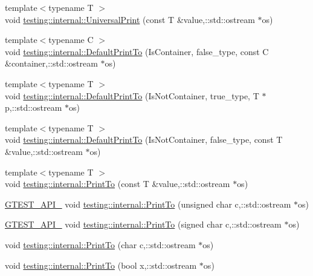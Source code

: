 \begin{DoxyCompactItemize}
\item 
{\footnotesize template$<$typename T $>$ }\\void \hyperlink{namespacetesting_1_1internal_ad121a890bddf866e59605d1a0198dada}{testing\+::internal\+::\+Universal\+Print} (const T \&value,\+::std\+::ostream $\ast$os)
\item 
{\footnotesize template$<$typename C $>$ }\\void \hyperlink{namespacetesting_1_1internal_a729016f07085b1cfb44d21331f791141}{testing\+::internal\+::\+Default\+Print\+To} (Is\+Container, false\+\_\+type, const C \&container,\+::std\+::ostream $\ast$os)
\item 
{\footnotesize template$<$typename T $>$ }\\void \hyperlink{namespacetesting_1_1internal_aa8dafaf55c18333baa5fdb858e69be96}{testing\+::internal\+::\+Default\+Print\+To} (Is\+Not\+Container, true\+\_\+type, T $\ast$p,\+::std\+::ostream $\ast$os)
\item 
{\footnotesize template$<$typename T $>$ }\\void \hyperlink{namespacetesting_1_1internal_a29e705ab252af57e825a086bb49c4831}{testing\+::internal\+::\+Default\+Print\+To} (Is\+Not\+Container, false\+\_\+type, const T \&value,\+::std\+::ostream $\ast$os)
\item 
{\footnotesize template$<$typename T $>$ }\\void \hyperlink{namespacetesting_1_1internal_a46859938b459a1581ec760755bc81fc7}{testing\+::internal\+::\+Print\+To} (const T \&value,\+::std\+::ostream $\ast$os)
\item 
\hyperlink{gtest-port_8h_aa73be6f0ba4a7456180a94904ce17790}{G\+T\+E\+S\+T\+\_\+\+A\+P\+I\+\_\+} void \hyperlink{namespacetesting_1_1internal_abae1a8d465376b68576918205ad706a9}{testing\+::internal\+::\+Print\+To} (unsigned char c,\+::std\+::ostream $\ast$os)
\item 
\hyperlink{gtest-port_8h_aa73be6f0ba4a7456180a94904ce17790}{G\+T\+E\+S\+T\+\_\+\+A\+P\+I\+\_\+} void \hyperlink{namespacetesting_1_1internal_a09f551128c4d165c37004e36ccc87aa0}{testing\+::internal\+::\+Print\+To} (signed char c,\+::std\+::ostream $\ast$os)
\item 
void \hyperlink{namespacetesting_1_1internal_ae91b06a9e343f5ddabff85626a7d507a}{testing\+::internal\+::\+Print\+To} (char c,\+::std\+::ostream $\ast$os)
\item 
void \hyperlink{namespacetesting_1_1internal_a832beb8c56070fc5c175b8bfd8bbeba0}{testing\+::internal\+::\+Print\+To} (bool x,\+::std\+::ostream $\ast$os)

\end{DoxyCompactItemize}
